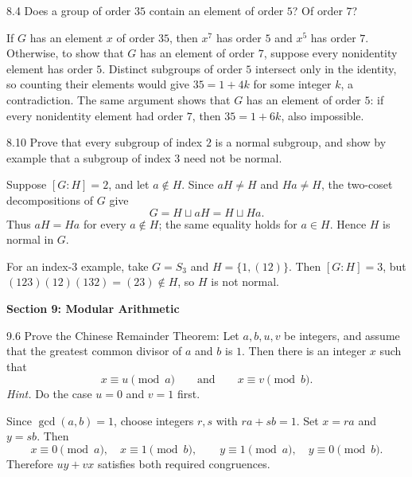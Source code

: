\documentclass[11pt]{article}
\newcommand{\sectionheading}[1]{%
  \Needspace{8\baselineskip}
  \vspace{0.25em}
  {\color{darkgray}\large\bfseries #1}\par
}
\begin{document}
\begin{exercise}{8.4}
Does a group of order $35$ contain an element of order $5$? Of order $7$?
\end{exercise}

\begin{solution}
If $G$ has an element $x$ of order $35$, then $x^7$ has order $5$ and
$x^5$ has order $7$. Otherwise, to show that $G$ has an element of order
$7$, suppose every nonidentity element has order $5$. Distinct subgroups
of order $5$ intersect only in the identity, so counting their elements
would give $35=1+4k$ for some integer $k$, a contradiction. The same
argument shows that $G$ has an element of order $5$: if every
nonidentity element had order $7$, then $35=1+6k$, also impossible.
\end{solution}

\begin{exercise}{8.10}
Prove that every subgroup of index $2$ is a normal subgroup, and show by
example that a subgroup of index $3$ need not be normal.
\end{exercise}

\begin{solution}
Suppose $[G:H]=2$, and let $a\notin H$. Since $aH\ne H$ and $Ha\ne H$,
the two-coset decompositions of $G$ give
\[
  G=H\sqcup aH=H\sqcup Ha.
\]
Thus $aH=Ha$ for every $a\notin H$; the same equality holds for $a\in H$.
Hence $H$ is normal in $G$.

For an index-$3$ example, take $G=S_3$ and $H=\{1,(12)\}$. Then
$[G:H]=3$, but $(123)(12)(132)=(23)\notin H$, so $H$ is not normal.
\end{solution}

\sectionheading{Section 9: Modular Arithmetic}

\begin{exercise}{9.6}
Prove the Chinese Remainder Theorem: Let $a,b,u,v$ be integers, and assume
that the greatest common divisor of $a$ and $b$ is $1$. Then there is an
integer $x$ such that
\[
  x\equiv u\pmod a
  \qquad\text{and}\qquad
  x\equiv v\pmod b.
\]
\textit{Hint.} Do the case $u=0$ and $v=1$ first.
\end{exercise}

\begin{solution}
Since $\gcd(a,b)=1$, choose integers $r,s$ with $ra+sb=1$. Set
$x=ra$ and $y=sb$. Then
\[
  x\equiv0\pmod a,\quad x\equiv1\pmod b,
  \qquad
  y\equiv1\pmod a,\quad y\equiv0\pmod b.
\]
Therefore $uy+vx$ satisfies both required congruences.
\end{solution}
\end{document}
